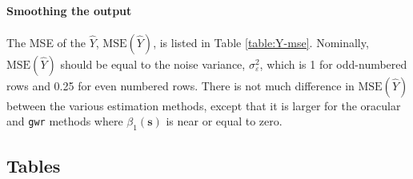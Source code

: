 \documentclass[authoryear, review, 11pt]{elsarticle}
\begin{document}
	
	\paragraph{Smoothing the output} The MSE of the $\hat{Y}$, $\text{MSE}\left(\hat{Y}\right)$, is listed in Table \ref{table:Y-mse}. Nominally, $\text{MSE}\left(\hat{Y}\right)$ should be equal to the noise variance, $\sigma_{\varepsilon}^2$, which is 1 for odd-numbered rows and 0.25 for even numbered rows. There is not much difference in $\text{MSE}\left(\hat{Y}\right)$ between the various estimation methods, except that it is larger for the oracular and \verb!gwr! methods where $\beta_1(\bm{s})$ is near or equal to zero.
	
	\subsection{Tables}
\end{document}

